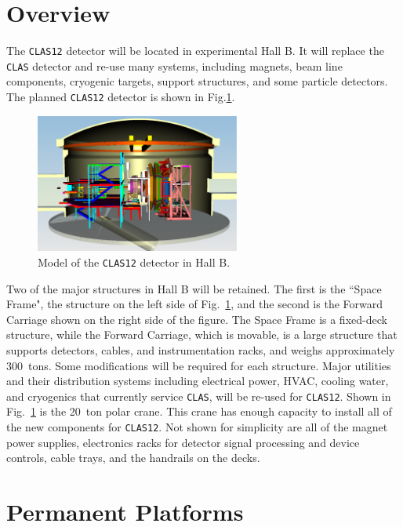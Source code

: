 \section{Overview}
 
The {\tt CLAS12} detector will be located in experimental Hall B. It 
will replace the {\tt CLAS} detector and re-use many systems, including 
magnets, beam line components, cryogenic targets, support structures, and 
some particle detectors. The planned {\tt CLAS12} detector is shown in 
Fig.\ref{in_clas}.

\begin{figure}[htbp]
\centering
\includegraphics[width=0.6\textwidth]{fig1overall.eps}
\caption{\small{Model of the {\tt CLAS12} detector in Hall B.}}
\label{in_clas}
\end{figure}

Two of the major structures in Hall B will be retained.  The first is
the ``Space Frame", the structure on the left side of Fig.~\ref{in_clas},
and the second is the Forward Carriage shown on the right side of the 
figure.  The Space Frame is a fixed-deck structure, while the Forward 
Carriage, which is movable, is a large structure that supports detectors, 
cables, and instrumentation racks, and weighs approximately 300~tons.  Some 
modifications will be required for each structure.  Major utilities and 
their distribution systems including electrical power, HVAC, cooling water, 
and cryogenics that currently service {\tt CLAS}, will be re-used for 
{\tt CLAS12}.  Shown in Fig.~\ref{in_clas} is the 20~ton polar crane.  
This crane has enough capacity to install all of the new components for 
{\tt CLAS12}.  Not shown for simplicity are all of the magnet power 
supplies, electronics racks for detector signal processing and device 
controls, cable trays, and the handrails on the decks.

\section{Permanent Platforms}

